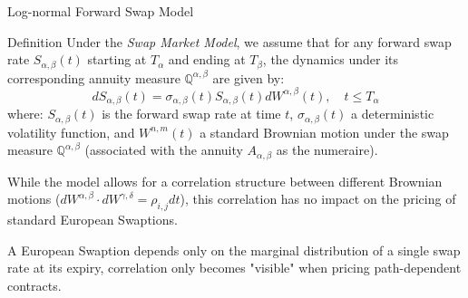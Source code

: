 \documentclass{beamer}
\begin{document}
\begin{frame}{Log-normal Forward Swap Model}
	\begin{block}{Definition}
		Under the \emph{Swap Market Model}, we assume that for any forward swap rate $S_{\alpha,\beta}(t)$ starting at $T_\alpha$ and ending at $T_\beta$, the dynamics under its corresponding annuity measure $\mathbb{Q}^{\alpha,\beta}$ are given by:
		\begin{equation}
		dS_{\alpha,\beta}(t) = \sigma_{\alpha,\beta}(t) S_{\alpha,\beta}(t) dW^{\alpha,\beta}(t), \quad t \leq T_\alpha
		\label{eq:swap_rate_dynamics}
		\end{equation}
		where: $S_{\alpha,\beta}(t)$ is the forward swap rate at time $t$, $\sigma_{\alpha,\beta}(t)$ a deterministic volatility function, and $W^{n,m}(t)$ a standard Brownian motion under the swap measure $\mathbb{Q}^{\alpha,\beta}$ (associated with the annuity $A_{\alpha,\beta}$ as the numeraire).
	\end{block}
	\vfill
	While the model allows for a correlation structure between different Brownian motions ($dW^{\alpha,\beta} \cdot dW^{\gamma,\delta} = \rho_{i,j} dt$), this correlation has no impact on the pricing of standard European Swaptions.

	A European Swaption depends only on the marginal distribution of a single swap rate at its expiry, correlation only becomes "visible" when pricing path-dependent contracts.
\end{frame}
\end{document}
